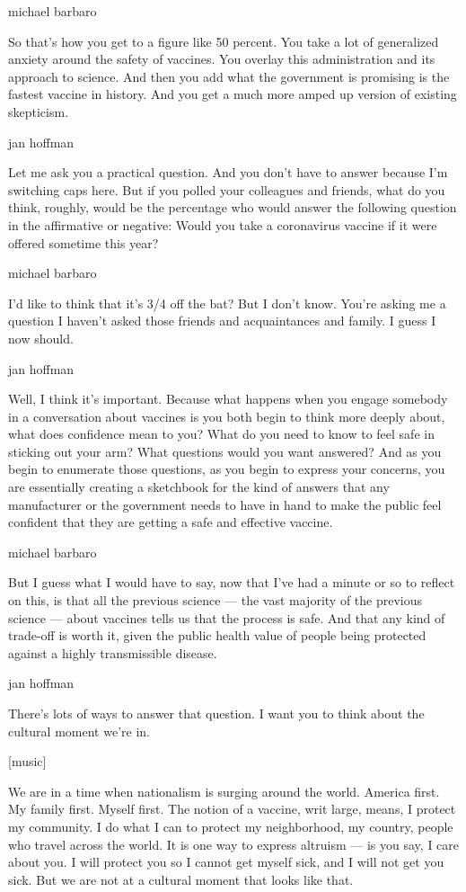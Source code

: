 michael barbaro

So that's how you get to a figure like 50 percent. You take a lot of
generalized anxiety around the safety of vaccines. You overlay this
administration and its approach to science. And then you add what the
government is promising is the fastest vaccine in history. And you get a
much more amped up version of existing skepticism.

jan hoffman

Let me ask you a practical question. And you don't have to answer
because I'm switching caps here. But if you polled your colleagues and
friends, what do you think, roughly, would be the percentage who would
answer the following question in the affirmative or negative: Would you
take a coronavirus vaccine if it were offered sometime this year?

michael barbaro

I'd like to think that it's 3/4 off the bat? But I don't know. You're
asking me a question I haven't asked those friends and acquaintances and
family. I guess I now should.

jan hoffman

Well, I think it's important. Because what happens when you engage
somebody in a conversation about vaccines is you both begin to think
more deeply about, what does confidence mean to you? What do you need to
know to feel safe in sticking out your arm? What questions would you
want answered? And as you begin to enumerate those questions, as you
begin to express your concerns, you are essentially creating a
sketchbook for the kind of answers that any manufacturer or the
government needs to have in hand to make the public feel confident that
they are getting a safe and effective vaccine.

michael barbaro

But I guess what I would have to say, now that I've had a minute or so
to reflect on this, is that all the previous science --- the vast
majority of the previous science --- about vaccines tells us that the
process is safe. And that any kind of trade-off is worth it, given the
public health value of people being protected against a highly
transmissible disease.

jan hoffman

There's lots of ways to answer that question. I want you to think about
the cultural moment we're in.

{[}music{]}

We are in a time when nationalism is surging around the world. America
first. My family first. Myself first. The notion of a vaccine, writ
large, means, I protect my community. I do what I can to protect my
neighborhood, my country, people who travel across the world. It is one
way to express altruism --- is you say, I care about you. I will protect
you so I cannot get myself sick, and I will not get you sick. But we are
not at a cultural moment that looks like that.

